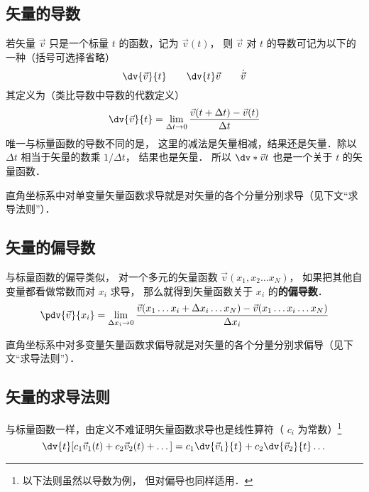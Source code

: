 

\subsection{矢量的导数}

若矢量 $\vec v$ 只是一个标量 $t$ 的函数，记为 $\vec v(t)$， 则 $\vec v$ 对 $t$ 的导数可记为以下的一种（括号可选择省略）
\begin{equation}
\dv{\vec v}{t} \qquad \dv{t}\vec v \qquad \dot{\vec v}
\end{equation}
其定义为（类比导数中导数的代数定义）
\begin{equation}
\dv{\vec v}{t} = \lim_{\Delta t \to 0} \frac{\vec v ( t + \Delta t) - \vec v(t)}{\Delta t}
\end{equation}
唯一与标量函数的导数不同的是， 这里的减法是矢量相减，结果还是矢量．除以 $\Delta t$ 相当于矢量的数乘 $1/\Delta t$， 结果也是矢量． 所以 $\dv*{\vec v}{t}$ 也是一个关于 $t$ 的矢量函数．

直角坐标系中对单变量矢量函数求导就是对矢量的各个分量分别求导（见下文“求导法则”）．

\subsection{矢量的偏导数}
与标量函数的偏导类似， 对一个多元的矢量函数 $\vec v(x_1, x_2\ldots x_N)$， 如果把其他自变量都看做常数而对 $x_i$ 求导， 那么就得到矢量函数关于 $x_i$ 的\textbf{的偏导数}．
\begin{equation}
\pdv{\vec v}{x_i} = \lim_{\Delta x_i \to 0} \frac{\vec v(x_1 \ldots x_i+\Delta x_i\ldots x_N) -  \vec v(x_1 \ldots x_i\ldots x_N)}{\Delta x_i}
\end{equation}

直角坐标系中对多变量矢量函数求偏导就是对矢量的各个分量分别求偏导（见下文“求导法则”）．

\subsection{矢量的求导法则}
与标量函数一样，由定义不难证明矢量函数求导也是线性算符（ $c_i$ 为常数）\footnote{以下法则虽然以导数为例， 但对偏导也同样适用．}
\begin{equation}
\dv{t}[{c_1}{\vec v_1}(t) + {c_2}{\vec v_2}(t) + \dots] = {c_1}\dv{\vec v_1}{t} + c_2\dv{\vec v_2}{t} \dots
\end{equation}

